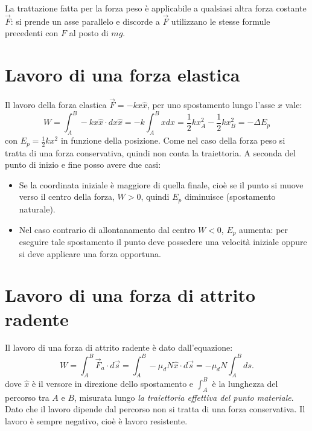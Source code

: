 \documentclass[class=book, crop=false, oneside, 12pt]{standalone}
\begin{document}
La trattazione fatta per la forza peso è applicabile a qualsiasi altra forza costante \(\overrightarrow{F}\): si prende un asse parallelo e discorde a \(\overrightarrow{F}\) utilizzano le stesse formule precedenti con \(F\) al posto di \(mg\).

\section{Lavoro di una forza elastica}

Il lavoro della forza elastica \(\overrightarrow{F} =-k x \hat{x}\), per uno spostamento lungo l'asse \(x\) vale:
\begin{equation}
    W = \int_A^B -k x\hat{x} \cdot dx \hat{x} = -k \int_A^B x dx = \frac{1}{2} k x^2_A - \frac{1}{2} k x^2_B = - \Delta E_p
\end{equation}
con \(E_p = \frac{1}{2} k x^2\) in funzione della posizione.\newline
Come nel caso della forza peso si tratta di una forza conservativa, quindi non conta la traiettoria.
A seconda del punto di inizio e fine posso avere due casi:
\begin{itemize}
    \item Se la coordinata iniziale è maggiore di quella finale, cioè se il punto si muove verso il centro della forza, \(W>0\), quindi \(E_p\) diminuisce (spostamento naturale).
    \item Nel caso contrario di allontanamento dal centro \(W < 0\), \(E_p\) aumenta: per eseguire tale spostamento il punto deve possedere una velocità iniziale oppure si deve applicare una forza opportuna.
\end{itemize}

\section{Lavoro di una forza di attrito radente}

Il lavoro di una forza di attrito radente è dato dall'equazione:
\begin{equation}
    W = \int_A^B \overrightarrow{F}_a \cdot d \overrightarrow{s} = \int_A^B -\mu_d N \hat{x} \cdot d \overrightarrow{s} = - \mu_d N \int_A^B ds .
\end{equation}
dove \(\hat{x}\) è il versore in direzione dello spostamento e \(\int_A^B\) è la lunghezza del percorso tra \(A\) e \(B\), misurata lungo \emph{la traiettoria effettiva del punto materiale}.\newline
Dato che il lavoro dipende dal percorso non si tratta di una forza conservativa.\newline
Il lavoro è sempre negativo, cioè è lavoro resistente.
\end{document}
